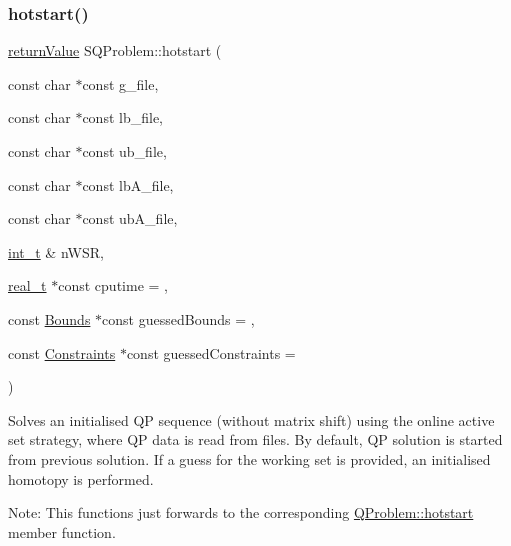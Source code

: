\subsubsection{\texorpdfstring{hotstart()}{hotstart()}\hspace{0.1cm}{\footnotesize\ttfamily [5/5]}}
{\footnotesize\ttfamily \hyperlink{_message_handling_8hpp_a81d556f613bfbabd0b1f9488c0fa865e}{return\+Value} S\+Q\+Problem\+::hotstart (\begin{DoxyParamCaption}\item[{const char $\ast$const}]{g\+\_\+file,  }\item[{const char $\ast$const}]{lb\+\_\+file,  }\item[{const char $\ast$const}]{ub\+\_\+file,  }\item[{const char $\ast$const}]{lb\+A\+\_\+file,  }\item[{const char $\ast$const}]{ub\+A\+\_\+file,  }\item[{\hyperlink{_types_8hpp_ab6fd6105e64ed14a0c9281326f05e623}{int\+\_\+t} \&}]{n\+W\+SR,  }\item[{\hyperlink{qp_o_a_s_e_s__wrapper_8h_a0d00e2b3dfadee81331bbb39068570c4}{real\+\_\+t} $\ast$const}]{cputime = {},  }\item[{const \hyperlink{class_bounds}{Bounds} $\ast$const}]{guessed\+Bounds = {},  }\item[{const \hyperlink{class_constraints}{Constraints} $\ast$const}]{guessed\+Constraints = {} }\end{DoxyParamCaption})}

Solves an initialised QP sequence (without matrix shift) using the online active set strategy, where QP data is read from files. By default, QP solution is started from previous solution. If a guess for the working set is provided, an initialised homotopy is performed.

Note\+: This functions just forwards to the corresponding \hyperlink{class_q_problem_a524c59e7638d982e46501e7695ce1693}{Q\+Problem\+::hotstart} member function.

